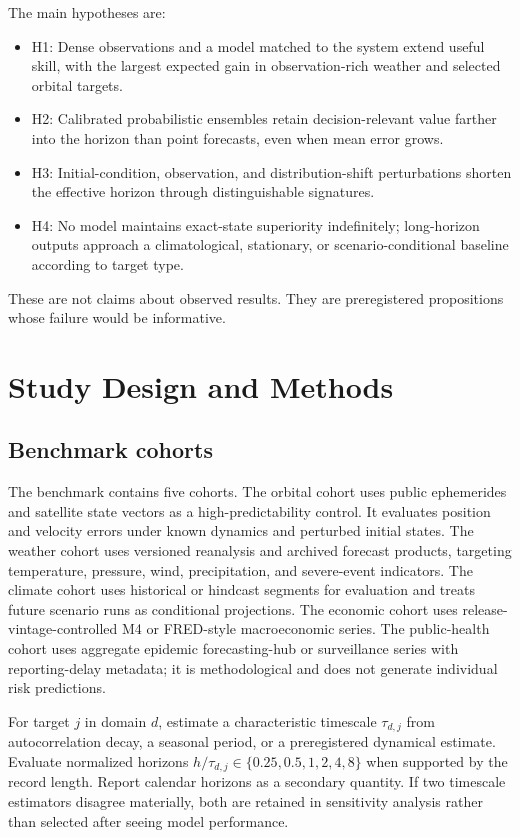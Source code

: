 \documentclass[conference]{IEEEtran}
\begin{document}
The main hypotheses are:
\begin{itemize}
\item H1: Dense observations and a model matched to the system extend useful skill, with the largest expected gain in observation-rich weather and selected orbital targets.
\item H2: Calibrated probabilistic ensembles retain decision-relevant value farther into the horizon than point forecasts, even when mean error grows.
\item H3: Initial-condition, observation, and distribution-shift perturbations shorten the effective horizon through distinguishable signatures.
\item H4: No model maintains exact-state superiority indefinitely; long-horizon outputs approach a climatological, stationary, or scenario-conditional baseline according to target type.
\end{itemize}

These are not claims about observed results. They are preregistered propositions whose failure would be informative.

\section{Study Design and Methods}
\subsection{Benchmark cohorts}
The benchmark contains five cohorts. The orbital cohort uses public ephemerides and satellite state vectors as a high-predictability control. It evaluates position and velocity errors under known dynamics and perturbed initial states. The weather cohort uses versioned reanalysis and archived forecast products, targeting temperature, pressure, wind, precipitation, and severe-event indicators. The climate cohort uses historical or hindcast segments for evaluation and treats future scenario runs as conditional projections. The economic cohort uses release-vintage-controlled M4 or FRED-style macroeconomic series. The public-health cohort uses aggregate epidemic forecasting-hub or surveillance series with reporting-delay metadata; it is methodological and does not generate individual risk predictions.

For target $j$ in domain $d$, estimate a characteristic timescale $\tau_{d,j}$ from autocorrelation decay, a seasonal period, or a preregistered dynamical estimate. Evaluate normalized horizons $h/\tau_{d,j}\in\{0.25,0.5,1,2,4,8\}$ when supported by the record length. Report calendar horizons as a secondary quantity. If two timescale estimators disagree materially, both are retained in sensitivity analysis rather than selected after seeing model performance.
\end{document}
